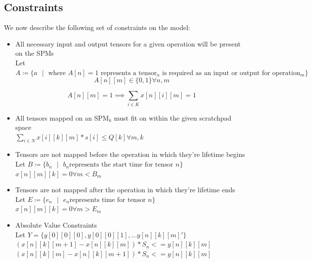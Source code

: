 \subsection{Constraints}
We now describe the following set of constraints on the model:
\begin{itemize}
	\item All necessary input and output tensors for a given operation will be present on the SPMs\\

		Let $A \coloneqq \{ a \text{ } | \text{ } \text{where } A[n] = 1\text{ represents a tensor$_n$ is required as an input or output for operation$_m$} \}$\\
		\[
			A[n][m] \in \{0, 1\} \forall n,m
		\]

		\[
			A[n][m] = 1 \implies \sum_{i \in K} x[n][i][m] = 1 
		\]

	\item All tensors mapped on an SPM$_k$ must fit on within the given scratchpad space\\

		$\sum_{i \in N} {x[i][k][m] * s[i]} \leq Q[k] \forall m,k$\\

	\item Tensors are not mapped before the operation in which they're lifetime begins \\

		Let $B \coloneqq \{ b_n \text{ } | \text{ }  b_n \text{represents the start time for tensor $n$}\}$ \\

		$x[n][m][k] = 0 \forall m < B_m$

	\item Tensors are not mapped after the operation in which they're lifetime ends \\

		Let $E \coloneqq \{ e_n \text{ } | \text{ }  e_n \text{represents time for tensor $n$}\}$ \\

		$x[n][m][k]= 0 \forall m > E_m$

	\item Absolute Value Constraints\\
		Let $Y = \{ y[0][0][0], y[0][0][1], ... y[n][k][m]\prime\}$\\
		$(x[n][k][m+1] - x[n][k][m]) * S_n <= y[n][k][m]$\\
		$(x[n][k][m] - x[n][k][m + 1]) * S_n <= y[n][k][m]$\\

\end{itemize}


